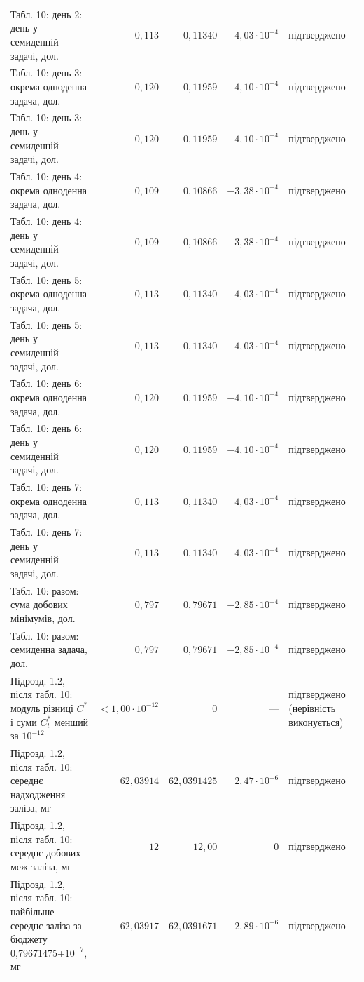 {\begin{longtable}{>{\raggedright}p{4.3cm}rrr>{\raggedright\arraybackslash}p{2.3cm}}
Табл. 10: день 2: день у семиденній задачі, дол. & $0{,}113$ & $0{,}11340$ & $4{,}03\cdot10^{-4}$ & підтверджено \\
Табл. 10: день 3: окрема одноденна задача, дол. & $0{,}120$ & $0{,}11959$ & $-4{,}10\cdot10^{-4}$ & підтверджено \\
Табл. 10: день 3: день у семиденній задачі, дол. & $0{,}120$ & $0{,}11959$ & $-4{,}10\cdot10^{-4}$ & підтверджено \\
Табл. 10: день 4: окрема одноденна задача, дол. & $0{,}109$ & $0{,}10866$ & $-3{,}38\cdot10^{-4}$ & підтверджено \\
Табл. 10: день 4: день у семиденній задачі, дол. & $0{,}109$ & $0{,}10866$ & $-3{,}38\cdot10^{-4}$ & підтверджено \\
Табл. 10: день 5: окрема одноденна задача, дол. & $0{,}113$ & $0{,}11340$ & $4{,}03\cdot10^{-4}$ & підтверджено \\
Табл. 10: день 5: день у семиденній задачі, дол. & $0{,}113$ & $0{,}11340$ & $4{,}03\cdot10^{-4}$ & підтверджено \\
Табл. 10: день 6: окрема одноденна задача, дол. & $0{,}120$ & $0{,}11959$ & $-4{,}10\cdot10^{-4}$ & підтверджено \\
Табл. 10: день 6: день у семиденній задачі, дол. & $0{,}120$ & $0{,}11959$ & $-4{,}10\cdot10^{-4}$ & підтверджено \\
Табл. 10: день 7: окрема одноденна задача, дол. & $0{,}113$ & $0{,}11340$ & $4{,}03\cdot10^{-4}$ & підтверджено \\
Табл. 10: день 7: день у семиденній задачі, дол. & $0{,}113$ & $0{,}11340$ & $4{,}03\cdot10^{-4}$ & підтверджено \\
Табл. 10: разом: сума добових мінімумів, дол. & $0{,}797$ & $0{,}79671$ & $-2{,}85\cdot10^{-4}$ & підтверджено \\
Табл. 10: разом: семиденна задача, дол. & $0{,}797$ & $0{,}79671$ & $-2{,}85\cdot10^{-4}$ & підтверджено \\
Підрозд. 1.2, після табл. 10: модуль різниці $C^*$ і суми $C_t^*$ менший за $10^{-12}$ & $<1{,}00\cdot10^{-12}$ & $0$ & --- & підтверджено (нерівність виконується) \\
Підрозд. 1.2, після табл. 10: середнє надходження заліза, мг & $62{,}03914$ & $62{,}0391425$ & $2{,}47\cdot10^{-6}$ & підтверджено \\
Підрозд. 1.2, після табл. 10: середнє добових меж заліза, мг & $12$ & $12{,}00$ & $0$ & підтверджено \\
Підрозд. 1.2, після табл. 10: найбільше середнє заліза за бюджету 0{,}79671475+$10^{-7}$, мг & $62{,}03917$ & $62{,}0391671$ & $-2{,}89\cdot10^{-6}$ & підтверджено \\

\end{longtable}}
